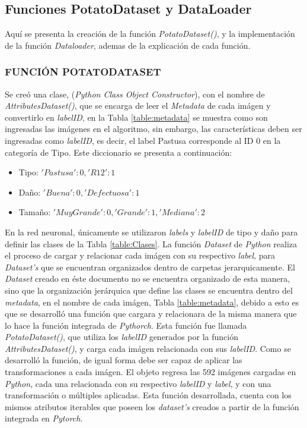 		\subsection{Funciones PotatoDataset y DataLoader}
		Aquí se presenta la creación de la función \textit{PotatoDataset()}, y la implementación de la función \textit{Dataloader}, ademas de la explicación de cada función.
		
		
			\subsubsection{FUNCIÓN POTATODATASET}
			
			Se creó una clase, (\textit{Python Class Object Constructor}), con el nombre de \textit{AttributesDataset()}, que se encarga de leer el \textit{Metadata}  de cada imágen y convertirlo en \textit{labelID}, en la Tabla \ref{table:metadata} se muestra como son ingresadas las imágenes en el algoritmo, sin embargo, las características deben ser ingresadas como \textit{labelID}, es decir, el label Pastusa corresponde al ID 0 en la categoría de Tipo. Este diccionario se presenta a continuación:			
	
			\begin{itemize}
				\item Tipo: ${'Pastusa': 0, 'R12': 1}$
				\item Daño: ${'Buena': 0, 'Defectuosa': 1}$
				\item Tamaño: ${'Muy Grande': 0, 'Grande': 1, 'Mediana': 2}$
			\end{itemize}

			En la red neuronal, únicamente se utilizaron \textit{labels} y \textit{labelID} de tipo y daño para definir las clases de la Tabla \ref{table:Clases}. La función \textit{Dataset} de \textit{Python} realiza el proceso de cargar y relacionar cada imágen con su respectivo \textit{label}, para \textit{Dataset's} que se encuentran organizados dentro de carpetas jerarquicamente. El \textit{Dataset} creado en éste documento no se encuentra organizado de esta manera, sino que la organización jerárquica que define las clases se encuentra dentro del \textit{metadata}, en el nombre de cada imágen, Tabla \ref{table:metadata}, debido a esto es que se desarrolló una función que cargara y relacionara de la misma manera que lo hace la función integrada de \textit{Pythorch}. Esta función fue llamada \textit{PotatoDataset()}, que utiliza los \textit{labelID} generados por la función \textit{AttributesDataset()}, y carga cada imágen relacionada con sus \textit{labelID}. Como se desarrolló la función, de igual forma debe ser capaz de aplicar las transformaciones a cada imágen. El objeto regresa las 592 imágenes cargadas en \textit{Python}, cada una relacionada con su respectivo \textit{labelID} y \textit{label}, y con una transformación o múltiples aplicadas. Esta función desarrollada, cuenta con los mismos atributos iterables que poseen los \textit{dataset's} creados a partir de la función integrada en \textit{Pytorch}.			
			
